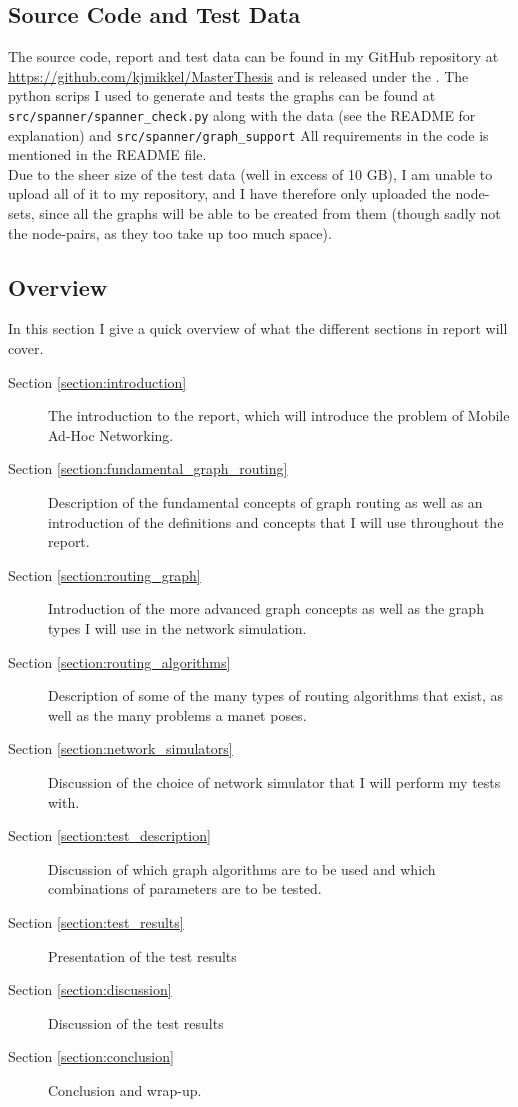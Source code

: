 \subsection{Source Code and Test Data}
\label{section:source_code}
The source code, report and test data can be found in my GitHub repository at \url{https://github.com/kjmikkel/MasterThesis} and is released under the .
The python scrips I used to generate and tests the graphs can be found at \texttt{src/spanner/spanner\_check.py} along with the data (see the README for explanation) and \texttt{src/spanner/graph\_support} All requirements in the code is mentioned in the README file.\\

Due to the sheer size of the test data (well in excess of 10 GB), I am unable to upload all of it to my repository, and I have therefore only uploaded the node-sets, since all the graphs will be able to be created from them (though sadly not the node-pairs, as they too take up too much space).

\subsection{Overview}
In this section I give a quick overview of what the different sections in report will cover.
\begin{description}
\item[Section \ref{section:introduction}] The introduction to the report, which will introduce the problem of Mobile Ad-Hoc Networking.
\item[Section \ref{section:fundamental_graph_routing}] Description of the fundamental concepts of graph routing as well as an introduction of the definitions and concepts that I will use throughout the report.
\item[Section \ref{section:routing_graph}] Introduction of the more advanced graph concepts as well as the graph types I will use in the network simulation.
\item[Section \ref{section:routing_algorithms}] Description of some of the many types of routing algorithms that exist, as well as the many problems a \ac{manet} poses.
\item[Section \ref{section:network_simulators}] Discussion of the choice of network simulator that I will perform my tests with. 
\item[Section \ref{section:test_description}] Discussion of which graph algorithms are to be used and which combinations of parameters are to be tested.
\item[Section \ref{section:test_results}] Presentation of the test results
\item[Section \ref{section:discussion}] Discussion of the test results
\item[Section \ref{section:conclusion}] Conclusion and wrap-up.
\end{description}

